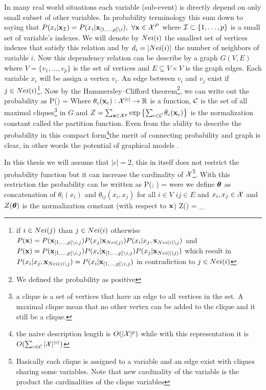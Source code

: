 In many real world situations each variable (sub-event) is directly depend on only small subset of other variables.
In probability terminology this sum down to saying that $P(x_i |{\bf x}_{{\cal I}}) = P(x_i|{\bf x}_{[1,\ldots,p] \setminus i}),\  \forall {\bf x} \in {\cal X}^{P}$ where ${\cal I} \subset \{1,\ldots,p\}$  is a small set of variable's indexes.
We will denote by $Nei(i)$ the smallest set of vertices indexes that satisfy this relation and by $d_i = |Nei(i)|$ the number of neighbors of variable $i$.  
Now this dependency relation can be describe by a graph $G(V,E)$ where $V = \{v_1,\ldots, v_p\}$ is the set of vertices and  $E \subseteq V \times V$ is the graph edges.
Each variable $x_i$ will be assign a vertex $v_i$. 
An edge between $v_i$ and $v_j$ exist if  $j \in Nei(i)$\footnote{if $i \in Nei(j)$ than $j \in Nei(i)$ otherwise $P({\bf x}) = P({\bf x}_{[1,\ldots,p]\setminus i,j}) P(x_j|{\bf x}_{Nei(j)}) P(x_i|x_j,{\bf x}_{Nei(i)\setminus j})$ and $P({\bf x}) = P({\bf x}_{[1,\ldots,p]\setminus i,j}) P(x_i|{\bf x}_{[1,\ldots,p]\setminus i,j}) P(x_j|{\bf x}_{Nei(()j)})$ which result in $P(x_i|x_j,{\bf x}_{Nei(i)\setminus j}) =   P(x_i|{\bf x}_{[1,\ldots,p]\setminus i,j})$ in contradiction to $j \in Nei(i)$}.
Now by the Hammersley–Clifford theorem\cite{hammersley1971markov}\footnote{We defined the probability as positive}, we can write out the probability as
\be
\label{eq:ciluqe_prob}
P(\xx) =  
\ee
Where $\theta_{c}({\bf x}_{c}): {\cal X}^{|c|} \to \mathbb{R}$  is a function, ${\cal C}$ is the set of all maximal cliques\footnote{a clique is a set of vertices that have an edge to all vertices in the set. A maximal clique mean that no other vertex can be added to the clique and it still be a clique.} in $G$ and $Z = \sum_{{\bf x} \in {\cal X}^p} {\mathrm{exp}}\left\{\sum_{c \in {\cal C}}\theta_{c}({\bf x}_{c})\right\}$ is the normalization constant called the partition function.
Even from the ability to describe the probability in this compact form\footnote{the naive description length is $O(|{\cal X}|^p)$ while with this representation it is $O(\sum_{c \in {\cal C}} |{\cal X}|^{|c|})$}the merit of connecting probability and graph is clear, in other words the potential of graphical models \cite{koller2009probabilistic}.


In this thesis we will assume that $|c| = 2$, this in itself does not restrict the probability function but it can increase the cardinality of ${\cal X}$\footnote{Basically each clique is assigned to a variable and an edge exist with cliques sharing some variables. Note that new cardinality of the variable is the product the cardinalities of the clique variables }.
With this restriction the probability can be written as
\be
\label{eq:basic_model}
P(\xx; \thetav) =  
\ee
were we define $\boldsymbol{\theta}$ as concatenation of $\theta_i(x_i)$ and $\theta_{ij}(x_i,x_j)$ for all $i \in V$ $ij \in E$ and $x_i,x_j \in {\cal X}$ and $Z(\boldsymbol{\theta})$ is the normalization constant (with respect to ${\bf x}$)
\be
\label{eq:partition_function}
Z(\thetav) = \sum_{\xx \in\cX}
\ee

